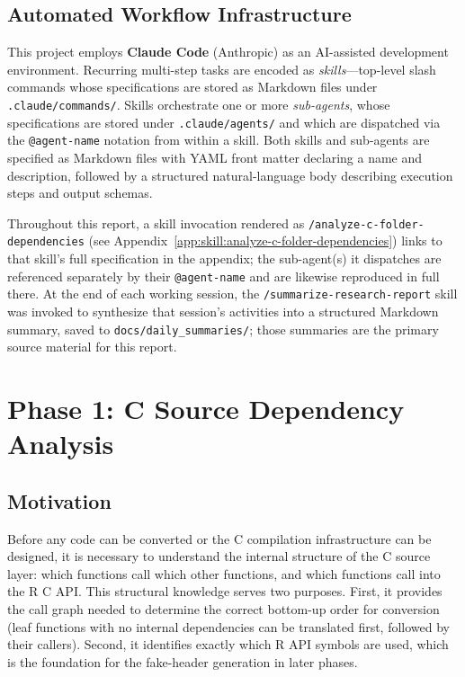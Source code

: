 \documentclass[12pt]{article}
\newcommand{\skill}[1]{\texttt{/#1}}
\newcommand{\skillapp}[2]{\texttt{/#1} (see Appendix~\ref{app:skill:#2})}
\begin{document}
\subsection{Automated Workflow Infrastructure}
\label{sec:intro:workflow}

This project employs \textbf{Claude Code} (Anthropic) as an AI-assisted development environment. Recurring multi-step tasks are encoded as \emph{skills}---top-level slash commands whose specifications are stored as Markdown files under \texttt{.claude/commands/}. Skills orchestrate one or more \emph{sub-agents}, whose specifications are stored under \texttt{.claude/agents/} and which are dispatched via the \texttt{@agent-name} notation from within a skill. Both skills and sub-agents are specified as Markdown files with YAML front matter declaring a name and description, followed by a structured natural-language body describing execution steps and output schemas.

Throughout this report, a skill invocation rendered as \skillapp{analyze-c-folder-dependencies}{analyze-c-folder-dependencies} links to that skill's full specification in the appendix; the sub-agent(s) it dispatches are referenced separately by their \texttt{@agent-name} and are likewise reproduced in full there. At the end of each working session, the \skill{summarize-research-report} skill was invoked to synthesize that session's activities into a structured Markdown summary, saved to \texttt{docs/daily\_summaries/}; those summaries are the primary source material for this report.

\section{Phase 1: C Source Dependency Analysis}
\label{sec:phase1}

\subsection{Motivation}

Before any code can be converted or the C compilation infrastructure can be designed, it is necessary to understand the internal structure of the C source layer: which functions call which other functions, and which functions call into the R C API. This structural knowledge serves two purposes. First, it provides the call graph needed to determine the correct bottom-up order for conversion (leaf functions with no internal dependencies can be translated first, followed by their callers). Second, it identifies exactly which R API symbols are used, which is the foundation for the fake-header generation in later phases.
\end{document}
